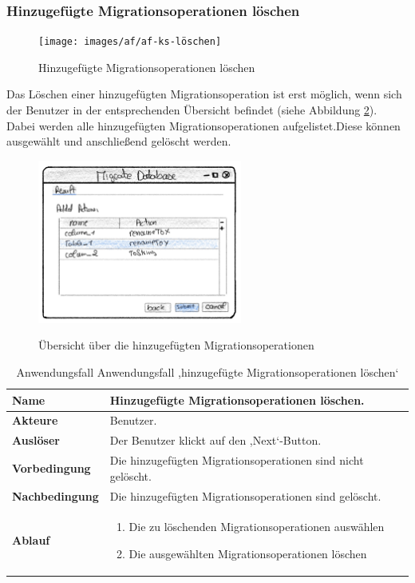 \subsubsection*{Hinzugefügte Migrationsoperationen löschen}	
\begin{figure}[H]
	\caption{Hinzugefügte Migrationsoperationen löschen}
	\centering
	\texttt{[image: images/af/af-ks-löschen]}
	\label{img:af-ks-löschen}
\end{figure}
Das Löschen einer hinzugefügten Migrationsoperation ist erst möglich, wenn sich der Benutzer in der entsprechenden Übersicht befindet (siehe Abbildung \ref{img:result-view}). Dabei werden alle hinzugefügten Migrationsoperationen aufgelistet.Diese können ausgewählt und anschließend gelöscht werden.
\begin{figure}[H]
	\caption{Übersicht über die hinzugefügten Migrationsoperationen}
	\centering
	\includegraphics[width=0.6\textwidth]{images/result-view}
	\label{img:result-view}
\end{figure}
\begin{table}[H]
	\centering
	\begin{tabular}{ |p{4cm}|p{8cm}| }
		\hline
		\textbf{Name} &  Hinzugefügte Migrationsoperationen löschen. \\
		\hline
		\textbf{Akteure} &  Benutzer. \\
		\hline
		\textbf{Auslöser} & Der Benutzer klickt auf den ,Next‘-Button. \\
		\hline
		\textbf{Vorbedingung} & Die hinzugefügten Migrationsoperationen sind nicht gelöscht.  \\
		\hline
		\textbf{Nachbedingung} &  Die hinzugefügten Migrationsoperationen sind gelöscht. \\
		\hline
		\textbf{Ablauf} &  
		\begin{enumerate}
			\item Die zu löschenden Migrationsoperationen auswählen
			\item Die ausgewählten Migrationsoperationen löschen
		\end{enumerate}  \\
		\hline
		
	\end{tabular}
	\caption{Anwendungsfall Anwendungsfall ,hinzugefügte Migrationsoperationen löschen‘}
	\label{table:migration-ks-löschen}
\end{table}



